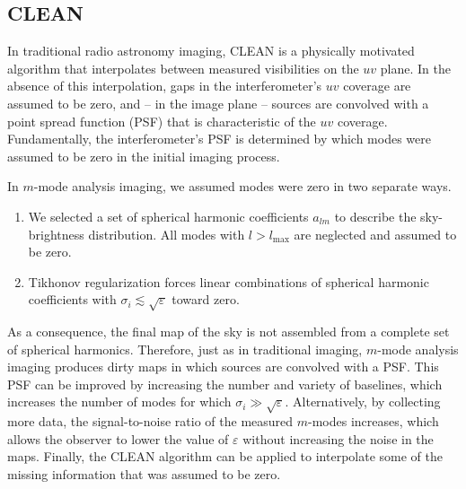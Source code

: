 \documentclass[twocolumn]{aastex61}
\begin{document}
\subsection{CLEAN}\label{sec:clean}

In traditional radio astronomy imaging, CLEAN \citep{1974A&AS...15..417H} is a physically motivated
algorithm that interpolates between measured visibilities on the $uv$ plane. In the absence of this
interpolation, gaps in the interferometer's $uv$ coverage are assumed to be zero, and -- in the
image plane -- sources are convolved with a point spread function (PSF) that is characteristic of
the $uv$ coverage.  Fundamentally, the interferometer's PSF is determined by which modes were
assumed to be zero in the initial imaging process.

In $m$-mode analysis imaging, we assumed modes were zero in two separate ways.
\begin{enumerate}
    \item We selected a set of spherical harmonic coefficients $a_{lm}$ to describe the
        sky-brightness distribution. All modes with $l>l_\text{max}$ are neglected and assumed to be
        zero.
    \item Tikhonov regularization forces linear combinations of spherical harmonic coefficients with
        $\sigma_i \lesssim \sqrt{\varepsilon}$ toward zero.
\end{enumerate}
As a consequence, the final map of the sky is not assembled from a complete set of spherical
harmonics. Therefore, just as in traditional imaging, $m$-mode analysis imaging produces dirty maps
in which sources are convolved with a PSF.  This PSF can be improved by increasing the number and
variety of baselines, which increases the number of modes for which $\sigma_i \gg
\sqrt{\varepsilon}$.  Alternatively, by collecting more data, the signal-to-noise ratio of the
measured $m$-modes increases, which allows the observer to lower the value of $\varepsilon$ without
increasing the noise in the maps.  Finally, the CLEAN algorithm can be applied to interpolate some
of the missing information that was assumed to be zero.
\end{document}
